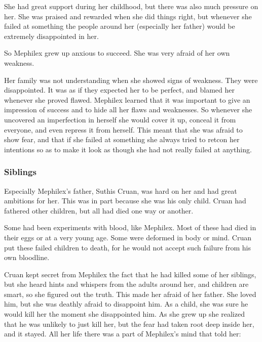 She had great support during her childhood, but there was also much pressure on her. 
She was praised and rewarded when she did things right, but whenever she failed at something the people around her (especially her father) would be extremely disappointed in her.

So Mephilex grew up anxious to succeed.
She was very afraid of her own weakness.

Her family was not understanding when she showed signs of weakness.
They were disappointed.
It was as if they expected her to be perfect, and blamed her whenever she proved flawed. 
Mephilex learned that it was important to give an impression of success and to hide all her flaws and weaknesses.
So whenever she uncovered an imperfection in herself she would cover it up, conceal it from everyone, and even repress it from herself. 
This meant that she was afraid to show fear, and that if she failed at something she always tried to retcon her intentions so as to make it look as though she had not really failed at anything.





\subsubsection{Siblings}
Especially Mephilex's father, Suthis Cruan, was hard on her and had great ambitions for her.
This was in part because she was his only child. 
Cruan had fathered other children, but all had died one way or another. 

Some had been experiments with \xs blood, like Mephilex. 
Most of these had died in their eggs or at a very young age.
Some were deformed in body or mind.
Cruan put these failed children to death, for he would not accept such failure from his own bloodline.

Cruan kept secret from Mephilex the fact that he had killed some of her siblings, but she heard hints and whispers from the adults around her, and children are smart, so she figured out the truth.
This made her afraid of her father.
She loved him, but she was deathly afraid to disappoint him.
As a child, she was sure he would kill her the moment she disappointed him.
As she grew up she realized that he was unlikely to just kill her, but the fear had taken root deep inside her, and it stayed. 
All her life there was a part of Mephilex's mind that told her: 





